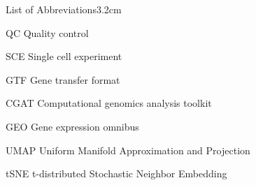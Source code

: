 \begin{mclistof}{List of Abbreviations}{3.2cm}
\item[QC] Quality control

\item[SCE] Single cell experiment

\item[GTF] Gene transfer format

\item[CGAT] Computational genomics analysis toolkit

\item[GEO] Gene expression omnibus

\item[UMAP] Uniform Manifold Approximation and Projection

\item[tSNE] t-distributed Stochastic Neighbor Embedding

\end{mclistof} 
